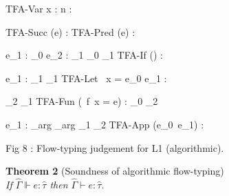 \begin{center}
                {TFA-Var}  {\hat\Gamma \Vdash x : \hat\tau}
  \quad {}    {\hat\Gamma \Vdash \overline n : }

                {TFA-Succ} {\hat\Gamma \Vdash {}(e) : }
  \quad {}
                {TFA-Pred} {\hat\Gamma \Vdash {}(e) : }

                          {\hat\Gamma \Vdash e_1 :                  \hat\tau_0}
                          {\hat\Gamma \Vdash e_2 :                  \hat\tau_1}
                          {\hat\tau_0 \preceq \hat\tau}
                          {\hat\tau_1 \preceq \hat\tau}
                {TFA-If}   {\hat\Gamma \Vdash () : \hat\tau}

                          {\hat{} \Vdash e_1 : \hat\tau_1}
                          {\hat\tau_1 \preceq \hat\tau}
                {TFA-Let}  {\hat\Gamma \Vdash {}\ x = e_0  e_1 : \hat\tau}

                           {\hat\tau_2 \preceq \hat\tau_1}
                {TFA-Fun}  {\hat\Gamma \Vdash (\ f\ x = e) : \hat\tau_0
                            \hat\tau_2}

                          {\hat\Gamma \Vdash e_1 : \hat\tau_{arg}}
                          {\hat\tau_{arg} \preceq \hat\tau_1 }
                          {\hat\tau_2 \preceq \hat\tau}
                {TFA-App}  {\hat\Gamma \Vdash (e_0\ e_1) : \hat\tau}

\vspace{.5cm}            Fig 8 : Flow-typing judgement for L1 (algorithmic).
\end{center}
{\bf Theorem 2} (Soundness of algorithmic flow-typing)\\
{\it If $\hat\Gamma \Vdash e : \hat\tau$ then $\hat\Gamma \vdash e : \hat\tau$}.

